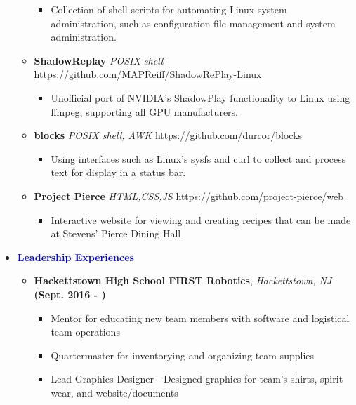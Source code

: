 \documentclass[11pt]{article}
\begin{document}
\begin{flushleft}
\begin{itemize}
\begin{itemize}
\begin{itemize}
                    \item Collection of shell scripts for automating Linux system administration, such as configuration file management and system administration.
                \end{itemize}
            \item \textbf{ShadowReplay} \textit{POSIX shell} \hfill{\url{https://github.com/MAPReiff/ShadowRePlay-Linux}}
                \begin{itemize}
                    \item Unofficial port of NVIDIA's ShadowPlay functionality to Linux using ffmpeg, supporting all GPU manufacturers.
                \end{itemize}
            \item \textbf{blocks} \textit{POSIX shell, AWK} \hfill{\url{https://github.com/durcor/blocks}}
                \begin{itemize}
                    \item Using interfaces such as Linux's sysfs and curl to collect and process text for display in a status bar.
                \end{itemize}
            \item \textbf{Project Pierce} \textit{HTML,CSS,JS} \hfill{\url{https://github.com/project-pierce/web}}
                \begin{itemize}
                    \item Interactive website for viewing and creating recipes that can be made at Stevens’ Pierce Dining Hall
                \end{itemize}
        \end{itemize}
    \item[] \Large \textcolor{blue}{\textbf{Leadership Experiences}} \normalsize
        \begin{itemize}
            \item \textbf{Hackettstown High School FIRST Robotics}, \textit{Hackettstown, NJ} \hfill{\textbf{(Sept. 2016 - )}}
                \begin{itemize}
                    \item Mentor for educating new team members with software and logistical team operations
                    \item Quartermaster for inventorying and organizing team supplies
                    \item Lead Graphics Designer - Designed graphics for team's shirts, spirit wear, and website/documents

\end{itemize}
\end{itemize}
\end{itemize}
\end{flushleft}
\end{document}
